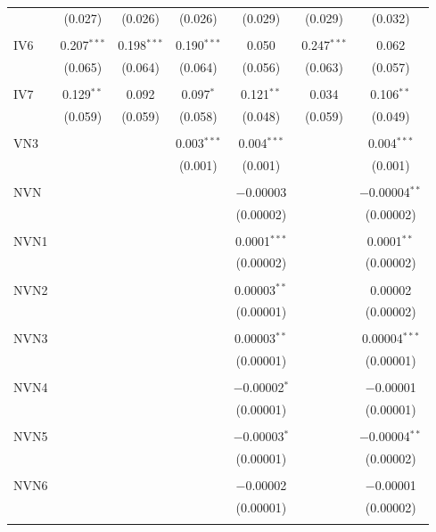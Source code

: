 \begin{table}[!htbp]
\begin{tabular}{@{\extracolsep{5pt}}lcccccc}
  & (0.027) & (0.026) & (0.026) & (0.029) & (0.029) & (0.032) \\ 
  & & & & & & \\ 
 IV6 & 0.207$^{***}$ & 0.198$^{***}$ & 0.190$^{***}$ & 0.050 & 0.247$^{***}$ & 0.062 \\ 
  & (0.065) & (0.064) & (0.064) & (0.056) & (0.063) & (0.057) \\ 
  & & & & & & \\ 
 IV7 & 0.129$^{**}$ & 0.092 & 0.097$^{*}$ & 0.121$^{**}$ & 0.034 & 0.106$^{**}$ \\ 
  & (0.059) & (0.059) & (0.058) & (0.048) & (0.059) & (0.049) \\ 
  & & & & & & \\ 
 VN3 &  &  & 0.003$^{***}$ & 0.004$^{***}$ &  & 0.004$^{***}$ \\ 
  &  &  & (0.001) & (0.001) &  & (0.001) \\ 
  & & & & & & \\ 
 NVN &  &  &  & $-$0.00003 &  & $-$0.00004$^{**}$ \\ 
  &  &  &  & (0.00002) &  & (0.00002) \\ 
  & & & & & & \\ 
 NVN1 &  &  &  & 0.0001$^{***}$ &  & 0.0001$^{**}$ \\ 
  &  &  &  & (0.00002) &  & (0.00002) \\ 
  & & & & & & \\ 
 NVN2 &  &  &  & 0.00003$^{**}$ &  & 0.00002 \\ 
  &  &  &  & (0.00001) &  & (0.00002) \\ 
  & & & & & & \\ 
 NVN3 &  &  &  & 0.00003$^{**}$ &  & 0.00004$^{***}$ \\ 
  &  &  &  & (0.00001) &  & (0.00001) \\ 
  & & & & & & \\ 
 NVN4 &  &  &  & $-$0.00002$^{*}$ &  & $-$0.00001 \\ 
  &  &  &  & (0.00001) &  & (0.00001) \\ 
  & & & & & & \\ 
 NVN5 &  &  &  & $-$0.00003$^{*}$ &  & $-$0.00004$^{**}$ \\ 
  &  &  &  & (0.00001) &  & (0.00002) \\ 
  & & & & & & \\ 
 NVN6 &  &  &  & $-$0.00002 &  & $-$0.00001 \\ 
  &  &  &  & (0.00001) &  & (0.00002) \\ 
  & & & & & & \\ 

\end{tabular}
\end{table}

